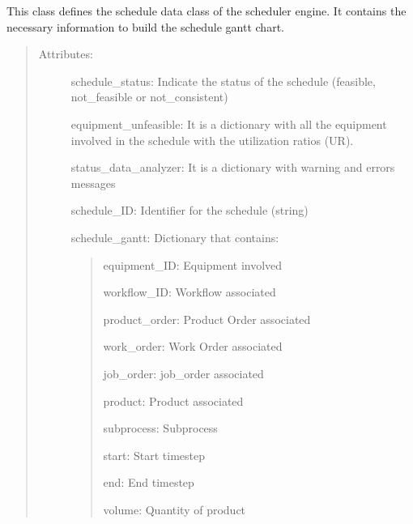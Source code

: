 \documentclass[letterpaper,10pt,english]{sphinxmanual}
\begin{document}
\begin{fulllineitems}
\label{\detokenize{index:src.scheduler_response.SchedulerResponse}}
\sphinxAtStartPar
{}

\sphinxAtStartPar
This class defines the schedule data class of the scheduler engine. It contains the necessary information to
build the schedule gantt chart.
\begin{quote}
\begin{description}
\item[{Attributes:}] \leavevmode
\sphinxAtStartPar
schedule\_status:         Indicate the status of the schedule (feasible, not\_feasible or not\_consistent)

\sphinxAtStartPar
equipment\_unfeasible:    It is a dictionary with all the equipment involved in the schedule with the
utilization ratios (UR).

\sphinxAtStartPar
status\_data\_analyzer:    It is a dictionary with warning and errors messages

\sphinxAtStartPar
schedule\_ID:             Identifier for the schedule (string)

\sphinxAtStartPar
schedule\_gantt:          Dictionary that contains:
\begin{quote}

\sphinxAtStartPar
equipment\_ID:        Equipment involved

\sphinxAtStartPar
workflow\_ID:         Workflow associated

\sphinxAtStartPar
product\_order:       Product Order associated

\sphinxAtStartPar
work\_order:          Work Order associated

\sphinxAtStartPar
job\_order:           job\_order associated

\sphinxAtStartPar
product:             Product associated

\sphinxAtStartPar
subprocess:          Subprocess

\sphinxAtStartPar
start:               Start timestep

\sphinxAtStartPar
end:                 End timestep

\sphinxAtStartPar
volume:              Quantity of product
\end{quote}

\end{description}
\end{quote}

\end{fulllineitems}
\end{document}
